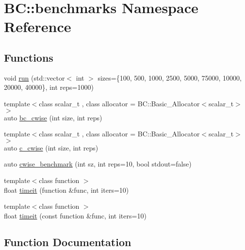 \hypertarget{namespaceBC_1_1benchmarks}{}\section{BC\+:\+:benchmarks Namespace Reference}
\label{namespaceBC_1_1benchmarks}
\subsection*{Functions}
\begin{DoxyCompactItemize}
\item 
void \hyperlink{namespaceBC_1_1benchmarks_add46a338875be9f4be596618df15d68e}{run} (std\+::vector$<$ int $>$ sizes=\{100, 500, 1000, 2500, 5000, 75000, 10000, 20000, 40000\}, int reps=1000)
\item 
{\footnotesize template$<$class scalar\+\_\+t , class allocator  = B\+C\+::\+Basic\+\_\+\+Allocator$<$scalar\+\_\+t$>$$>$ }\\auto \hyperlink{namespaceBC_1_1benchmarks_a1d1d494d954f7846e7863d659693fde8}{bc\+\_\+cwise} (int size, int reps)
\item 
{\footnotesize template$<$class scalar\+\_\+t , class allocator  = B\+C\+::\+Basic\+\_\+\+Allocator$<$scalar\+\_\+t$>$$>$ }\\auto \hyperlink{namespaceBC_1_1benchmarks_a044db82dfdc102f3994595be8a9ae13a}{c\+\_\+cwise} (int size, int reps)
\item 
auto \hyperlink{namespaceBC_1_1benchmarks_ad95941f83bba8f45ab77fa5e32c2c09f}{cwise\+\_\+benchmark} (int sz, int reps=10, bool stdout=false)
\item 
{\footnotesize template$<$class function $>$ }\\float \hyperlink{namespaceBC_1_1benchmarks_a73c054a10290b4186e0ab7f5b89e64e2}{timeit} (function \&func, int iters=10)
\item 
{\footnotesize template$<$class function $>$ }\\float \hyperlink{namespaceBC_1_1benchmarks_a8c9df466e8f843f4356251b00d073bc9}{timeit} (const function \&func, int iters=10)
\end{DoxyCompactItemize}


\subsection{Function Documentation}
